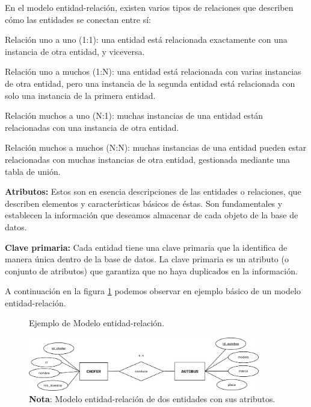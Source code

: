		En el modelo entidad-relación, existen varios tipos de relaciones que describen cómo las entidades se conectan entre sí:
		
		Relación uno a uno (1:1): una entidad está relacionada exactamente con una instancia de otra entidad, y viceversa.
		
		Relación uno a muchos (1:N): una entidad está relacionada con varias instancias de otra entidad, pero una instancia de la segunda entidad está relacionada con solo una instancia de la primera entidad.
		
		Relación muchos a uno (N:1): muchas instancias de una entidad están relacionadas con una instancia de otra entidad.
		
		Relación muchos a muchos (N:N): muchas instancias de una entidad pueden estar relacionadas con muchas instancias de otra entidad, gestionada mediante una tabla de unión.
		
		\textbf{Atributos:} Estos son en esencia descripciones de las entidades o relaciones, que describen elementos y características básicos de éstas. Son fundamentales y establecen la información que deseamos almacenar de cada objeto de la base de datos.
		
		\textbf{Clave primaria:} Cada entidad tiene una clave primaria que la identifica de manera única dentro de la base de datos. La clave primaria es un atributo (o conjunto de atributos) que garantiza que no haya duplicados en la información.
		
		A continuación en la figura \ref{fig:figura2_3} podemos observar en ejemplo básico de un modelo entidad-relación.
		
		\vspace{0.3cm} %
		
		\begin{figure}[h] %
			\caption[Ejemplo MER]
			{\newline Ejemplo de Modelo entidad-relación.} %
			\centering
			\includegraphics[width=0.9\textwidth]{imagenes/figura2_3.png} %
			\vspace{0.3cm}
			\caption*{\textup{\textbf{Nota}: Modelo entidad-relación de dos entidades con sus atributos.}}
			\vspace{-0.75cm}
			\label{fig:figura2_3} %
		\end{figure}
	
